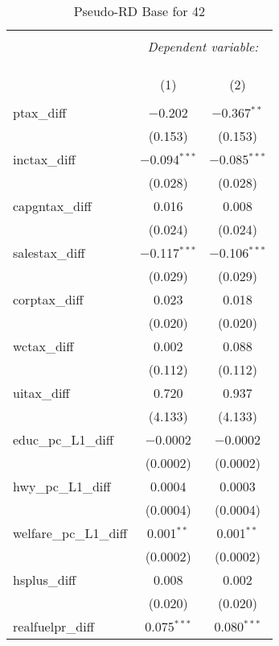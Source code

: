 
\begin{table}[!htbp] \centering 
  \caption{Pseudo-RD Base for  42} 
  \label{} 
\begin{tabular}{@{\extracolsep{5pt}}lcc} 
\\[-1.8ex]\hline 
\hline \\[-1.8ex] 
 & \multicolumn{2}{c}{\textit{Dependent variable:}} \\ 
\cline{2-3} 
\\[-1.8ex] & \multicolumn{2}{c}{ } \\ 
\\[-1.8ex] & (1) & (2)\\ 
\hline \\[-1.8ex] 
 ptax\_diff & $-$0.202 & $-$0.367$^{**}$ \\ 
  & (0.153) & (0.153) \\ 
  inctax\_diff & $-$0.094$^{***}$ & $-$0.085$^{***}$ \\ 
  & (0.028) & (0.028) \\ 
  capgntax\_diff & 0.016 & 0.008 \\ 
  & (0.024) & (0.024) \\ 
  salestax\_diff & $-$0.117$^{***}$ & $-$0.106$^{***}$ \\ 
  & (0.029) & (0.029) \\ 
  corptax\_diff & 0.023 & 0.018 \\ 
  & (0.020) & (0.020) \\ 
  wctax\_diff & 0.002 & 0.088 \\ 
  & (0.112) & (0.112) \\ 
  uitax\_diff & 0.720 & 0.937 \\ 
  & (4.133) & (4.133) \\ 
  educ\_pc\_L1\_diff & $-$0.0002 & $-$0.0002 \\ 
  & (0.0002) & (0.0002) \\ 
  hwy\_pc\_L1\_diff & 0.0004 & 0.0003 \\ 
  & (0.0004) & (0.0004) \\ 
  welfare\_pc\_L1\_diff & 0.001$^{**}$ & 0.001$^{**}$ \\ 
  & (0.0002) & (0.0002) \\ 
  hsplus\_diff & 0.008 & 0.002 \\ 
  & (0.020) & (0.020) \\ 
  realfuelpr\_diff & 0.075$^{***}$ & 0.080$^{***}$ \\ 

\end{tabular}
\end{table}
